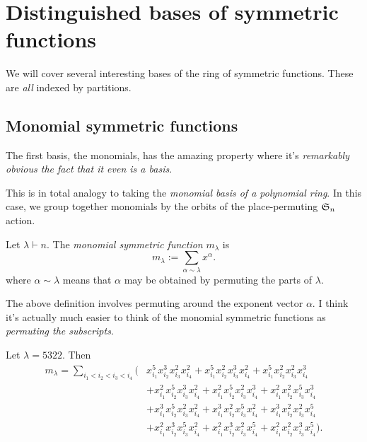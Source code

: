 \documentclass{article}
\newcommand{\frkS}{\ensuremath\mathfrak{S}}
\begin{document}
\section{Distinguished bases of symmetric functions}

We will cover several interesting bases of the ring of symmetric functions. These are \textit{all} indexed by partitions.

\subsection{Monomial symmetric functions}

The first basis, the monomials, has the amazing property where it's \textit{remarkably obvious the fact that it even is a basis}.

This is in total analogy to taking the \textit{monomial basis of a polynomial ring}. In this case, we group together monomials by the orbits of the place-permuting $\frkS_n$ action.

\begin{definition}
    Let $\lambda \vdash n$. The \textit{monomial symmetric function} $m_\lambda$ is 
    \[
        m_\lambda := \sum_{\alpha \sim \lambda} x^\alpha.
    \]
    where $\alpha \sim \lambda$ means that $\alpha$ may be obtained by permuting the parts of $\lambda$.
\end{definition}

The above definition involves permuting around the exponent vector $\alpha$. I think it's actually much easier to think of the monomial symmetric functions as \textit{permuting the subscripts}. 

\begin{example}
    Let $\lambda = 5322$. Then
    \begin{align*}
        m_\lambda = \sum_{i_1<i_2<i_3<i_4} \Big(&x_{i_1}^5x_{i_2}^3x_{i_3}^2x_{i_4}^2 + x_{i_1}^5x_{i_2}^2x_{i_3}^3x_{i_4}^2 + x_{i_1}^5x_{i_2}^2x_{i_3}^2x_{i_4}^3 \\ 
                                           &+ x_{i_1}^2x_{i_2}^5x_{i_3}^3x_{i_4}^2 + x_{i_1}^2x_{i_2}^5x_{i_3}^2x_{i_4}^3 + x_{i_1}^2x_{i_2}^2x_{i_3}^5x_{i_4}^3  \\
                                           &+ x_{i_1}^3x_{i_2}^5x_{i_3}^2x_{i_4}^2 + x_{i_1}^3x_{i_2}^2x_{i_3}^5x_{i_4}^2 + x_{i_1}^3x_{i_2}^2x_{i_3}^2x_{i_4}^5  \\
                                           &+ x_{i_1}^2x_{i_2}^3x_{i_3}^5x_{i_4}^2 + x_{i_1}^2x_{i_2}^3x_{i_3}^2x_{i_4}^5 + x_{i_1}^2x_{i_2}^2x_{i_3}^3x_{i_4}^5 \Big).
    \end{align*}
\end{example}
\end{document}
